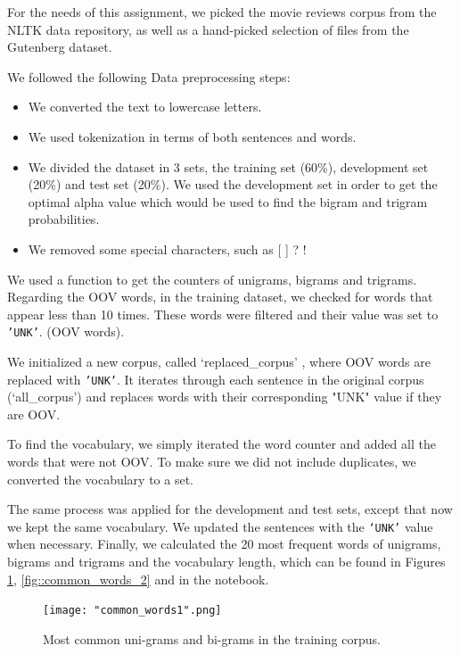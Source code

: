 \documentclass[11pt, a4paper]{article}
\begin{document}
	For the needs of this assignment, we picked the movie reviews corpus from the NLTK data repository, as well as a hand-picked selection of files from the Gutenberg dataset. 
	
	We followed the following Data preprocessing steps:
	
	\begin{itemize}
		\item We converted the text to lowercase letters.
		\item We used tokenization in terms of both sentences and words.
		\item We divided the dataset in 3 sets, the training set (60\%), development set (20\%) and test set (20\%). We used the development set in order to get the optimal alpha value which would be used to find the bigram and trigram probabilities.
		\item We removed some special characters, such as [ ] ? !
		
	\end{itemize}

	
	We used a function to get the counters of unigrams, bigrams and trigrams.  Regarding the OOV words, in the training dataset, we checked for words that appear less than 10 times. These words were filtered and their value was set to \texttt{'UNK'}. (OOV words).
	
	We initialized a new corpus, called ‘replaced\_corpus’ , where  OOV words are replaced with \texttt{'UNK'}. It iterates through each sentence in the original corpus (‘all\_corpus’) and replaces words with their corresponding "UNK" value if they are OOV.
	
	To find the vocabulary, we simply iterated the word counter and added all the words that were not OOV. To make sure we did not include duplicates, we converted the vocabulary to a set.
	
	The same process was applied for the development and test sets, except that now we kept the same vocabulary. We updated the sentences with the \texttt{‘UNK’} value when necessary. Finally, we calculated the 20 most frequent words of unigrams, bigrams and trigrams and the vocabulary length, which can be found in Figures \ref{fig::common_words_1}, \ref{fig::common_words_2} and in the notebook.
	
	 \begin{figure}
	    \centering
	    \texttt{[image: "common\_words1".png]}
	    \caption{Most common uni-grams and bi-grams in the training corpus.}
	    \label{fig::common_words_1}
	\end{figure}
	
\end{document}
